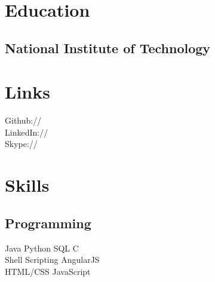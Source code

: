 \documentclass[]{rajnikant-resume-openfont}
\begin{document}
%
%

%
%



%
%

\begin{minipage}[t]{0.33\textwidth} 


\section{Education} 

\subsection{National Institute of Technology}



\section{Links} 
Github:// \href{https://github.com/rajnikant7008}{} \\
LinkedIn://  \href{https://www.linkedin.com/in/rajnikant7008}{} \\
Skype://  {}



\section{Skills}
\subsection{Programming}
Java \textbullet{}  Python \textbullet{} SQL \textbullet{} C \\ 
Shell Scripting \textbullet{} AngularJS \\
HTML/CSS \textbullet{} JavaScript
\sectionsep


\end{minipage}
\end{document}
